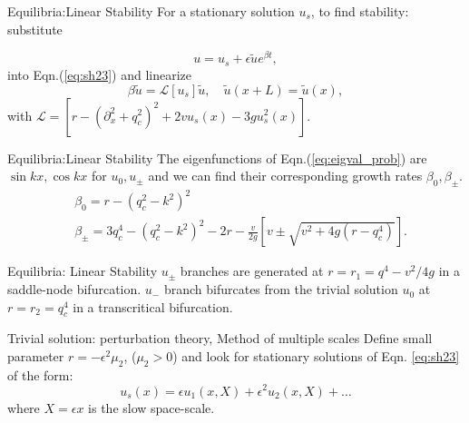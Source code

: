 \documentclass{beamer}
\begin{document}
\begin{frame}{Equilibria:Linear Stability}
For a stationary solution $u_{s}$, to find stability: substitute 

\begin{equation}\label{eq:linstab_ansatz}
 u = u_{s} + \epsilon\tilde{u}e^{\beta t},
\end{equation}
into Eqn.(\ref{eq:sh23}) and linearize
\begin{equation}\label{eq:eigval_prob}
 \beta \tilde{u} = \mathcal{L}[u_{s}] \tilde{u}, \quad  \tilde{u}(x+L) = \tilde{u}(x),
\end{equation}
%
with $\mathcal{L} = [r - (\partial_{x}^{2} + q_{c}^{2})^{2} + 2 v u_{s}(x) - 3gu_{s}^{2}(x) ]$.
\end{frame}
\begin{frame}{Equilibria:Linear Stability}
The eigenfunctions of Eqn.(\ref{eq:eigval_prob}) are $\sin{kx}, \cos{kx}$ for $u_{0}, u_{\pm}$ and we can find their corresponding growth rates $\beta_{0}, \beta_{\pm}$. 
\begin{align}
 & \beta_{0} = r - (q_{c}^{2}-k^{2})^{2}\\
 &\beta_{\pm} = 3q_{c}^{4} - (q_{c}^{2}-k^{2})^{2} - 2r - \frac{v}{2g}\left[v \pm \sqrt{v^{2} + 4g(r-q_{c}^{4})}\right].
\end{align}

\end{frame}
\begin{frame}{Equilibria: Linear Stability}
$u_{\pm}$ branches are generated at $r = r_{1} = q^{4}- v^{2}/4g$ in a saddle-node bifurcation. $u_{-}$ branch bifurcates from the trivial solution $u_{0}$ at $r = r_{2} = q_{c}^{4}$ in a transcritical bifurcation.  

\end{frame}
\begin{frame}{Trivial solution: perturbation theory, Method of multiple scales}
Define small parameter $r = - \epsilon^{2} \mu_{2}$, ($\mu_{2} > 0$) and look for stationary solutions of Eqn. \ref{eq:sh23} of the form:
\begin{equation}
u_{s}(x)=\epsilon u_{1}(x, X)+\epsilon^{2} u_{2}(x, X)+\hdots
\end{equation}
where $X = \epsilon x$ is the slow space-scale.
\end{frame}
\end{document}
